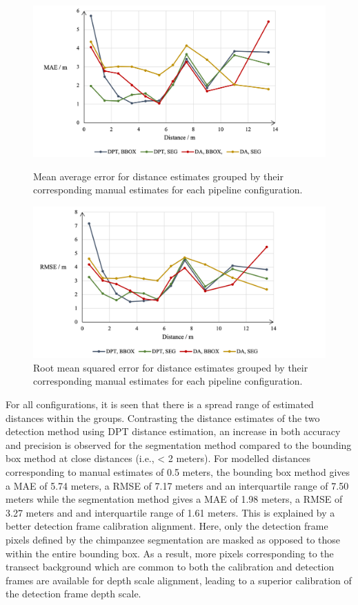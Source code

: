 \begin{figure}[H]
    \vspace{1cm}
    \centering
    \includegraphics[width=1.01\textwidth]{body/analysis/assets/errors/MAE}
    \caption{Mean average error for distance estimates grouped by their corresponding manual
    estimates for each pipeline configuration.}
    \label{fig:mae}

    \vspace{2cm}

    \includegraphics[width=1.01\textwidth]{body/analysis/assets/errors/RMSE}
    \caption{Root mean squared error for distance estimates grouped by their corresponding manual
    estimates for each pipeline configuration.}
    \label{fig:rmse}
\end{figure}

\clearpage

For all configurations, it is seen that there is a spread range of estimated distances
within the groups.
Contrasting the distance estimates of the two detection method using DPT distance estimation,
an increase in both accuracy and precision is observed for the segmentation method compared
to the bounding box method at close distances (i.e., < 2 meters).
For modelled distances corresponding to manual estimates of 0.5 meters, the bounding box
method gives a MAE of 5.74 meters, a RMSE of 7.17 meters and an interquartile range of 7.50
meters while the segmentation method gives a MAE of 1.98 meters, a RMSE of 3.27 meters and
and interquartile range of 1.61 meters.
This is explained by a better detection frame calibration alignment.
Here, only the detection frame pixels defined by the chimpanzee segmentation are masked as
opposed to those within the entire bounding box.
As a result, more pixels corresponding to the transect background which are common to both
the calibration and detection frames are available for depth scale alignment, leading to a
superior calibration of the detection frame depth scale.

